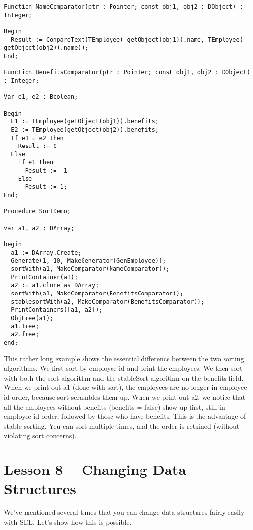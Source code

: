 \documentclass{report}
\begin{document}
\begin{lstlisting}
Function NameComparator(ptr : Pointer; const obj1, obj2 : DObject) : Integer;

Begin
  Result := CompareText(TEmployee( getObject(obj1)).name, TEmployee( getObject(obj2)).name));
End;

Function BenefitsComparator(ptr : Pointer; const obj1, obj2 : DObject) : Integer;

Var e1, e2 : Boolean;

Begin
  E1 := TEmployee(getObject(obj1)).benefits;
  E2 := TEmployee(getObject(obj2)).benefits;
  If e1 = e2 then
    Result := 0
  Else 
    if e1 then
      Result := -1
    Else
      Result := 1;
End;

Procedure SortDemo;

var a1, a2 : DArray;

begin
  a1 := DArray.Create;
  Generate(1, 10, MakeGenerator(GenEmployee));
  sortWith(a1, MakeComparator(NameComparator));
  PrintContainer(a1);
  a2 := a1.clone as DArray;
  sortWith(a1, MakeComparator(BenefitsComparator));
  stablesortWith(a2, MakeComparator(BenefitsComparator));
  PrintContainers([a1, a2]);
  ObjFree(a1);
  a1.free;
  a2.free;
end;
\end{lstlisting}

This rather long example shows the essential difference between the two
sorting algorithms. We first sort by employee id and print the employees. 
We then sort with both the sort algorithm and the stableSort algorithm on
the benefits field.  When we print out a1 (done with sort), the employees
are no longer in employee id order, because sort scrambles them up. When we
print out a2, we notice that all the employees without benefits (benefits =
false) show up first, still in employee id order, followed by those who have
benefits. This is the advantage of stable-sorting. You can sort multiple
times, and the order is retained (without violating sort concerns).

\section{Lesson 8 -- Changing Data Structures}

We've mentioned several times that you can change data 
structures fairly easily with SDL.
Let's show how this is possible.
\end{document}
